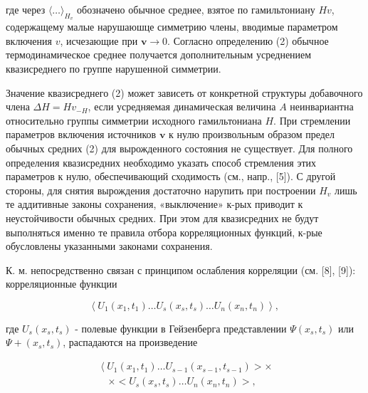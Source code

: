 \documentclass[10pt]{article}
\begin{document}
где через $\langle\ldots\rangle_{H_{v}}$ обозначено обычное среднее, взятое по гамильтониану $H v$, содержащему малые нарушаюшце симметрию члены, вводимые параметром включения $v$, исчезающие при $\boldsymbol{v} \rightarrow 0$. Согласно определению (2) обычное термодинамическое среднее получается дополнительным усреднением квазисреднего по группе нарушенной симметрии.



Значение квазисреднего (2) может зависеть от конкретной структуры добавочного члена $\Delta H=H v_{-H}$, если усредняемая динамическая величина $A$ неинвариантна относительно группы симметрии исходного гамильтониана $H$. При стремлении параметров включения источников $\boldsymbol{v}$ к нулю произвольным образом предел обычных средних (2) для вырожденного состояния не существует. Для полного определения квазисредних необходимо указать способ стремления этих параметров к нулю, обеспечивающий сходимость (см., напр., [5]). С другой стороны, для снятия вырождения достаточно нарупить при построении $H_{v}$ лишь те аддитивные законы сохранения, «выключение» к-рых приводит к неустойчивости обычных средних. При этом для квазисредних не будут выполняться именно те правила отбора корреляционных функций, к-рые обусловлены указанными законами сохранения.



К. м. непосредственно связан с принципом ослабления корреляции (см. [8], [9]): корреляционные функции



\[

\left\langle U_{1}\left(x_{1}, t_{1}\right) \ldots U_{s}\left(x_{s}, t_{s}\right) \ldots U_{n}\left(x_{n}, t_{n}\right)\right\rangle \text {, }

\]



где $U_{s}\left(x_{s}, t_{s}\right)$ - полевые функции в Гейзенберга представлении $\Psi\left(x_{s}, t_{s}\right)$ или $\Psi+\left(x_{s}, t_{s}\right)$, распадаются на произведение



\[

\begin{gathered}

\left\langle U_{1}\left(x_{1}, t_{1}\right) \ldots U_{s-1}\left(x_{s-1}, t_{s-1}\right)>\times\right. \\

\quad \times<U_{s}\left(x_{s}, t_{s}\right) \ldots U_{n}\left(x_{n}, t_{n}\right)>,

\end{gathered}

\]
\end{document}
